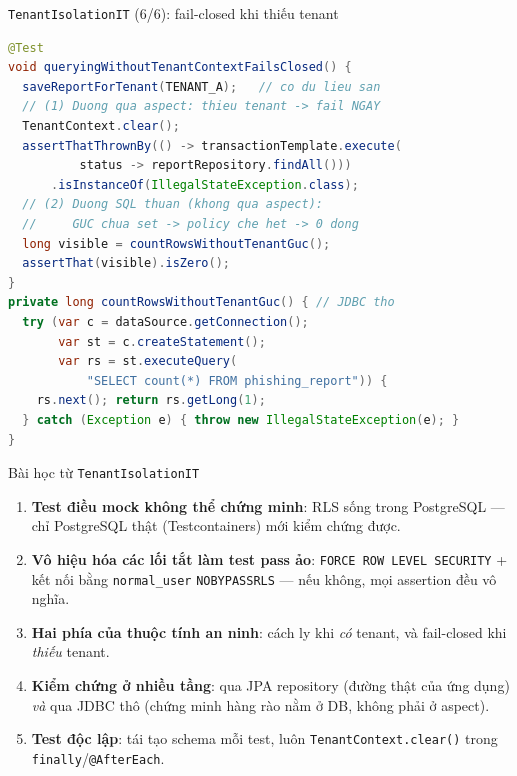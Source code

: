 \documentclass[aspectratio=169,12pt]{beamer}
\begin{document}
\begin{frame}[fragile]{\texttt{TenantIsolationIT} (6/6): fail-closed khi thiếu tenant}
  \vspace*{-0.4em}
\begin{lstlisting}[language=Java,style=codesm,basicstyle=\ttfamily\scriptsize]
@Test
void queryingWithoutTenantContextFailsClosed() {
  saveReportForTenant(TENANT_A);   // co du lieu san
  // (1) Duong qua aspect: thieu tenant -> fail NGAY
  TenantContext.clear();
  assertThatThrownBy(() -> transactionTemplate.execute(
          status -> reportRepository.findAll()))
      .isInstanceOf(IllegalStateException.class);
  // (2) Duong SQL thuan (khong qua aspect):
  //     GUC chua set -> policy che het -> 0 dong
  long visible = countRowsWithoutTenantGuc();
  assertThat(visible).isZero();
}
private long countRowsWithoutTenantGuc() { // JDBC tho
  try (var c = dataSource.getConnection();
       var st = c.createStatement();
       var rs = st.executeQuery(
           "SELECT count(*) FROM phishing_report")) {
    rs.next(); return rs.getLong(1);
  } catch (Exception e) { throw new IllegalStateException(e); }
}
\end{lstlisting}
\end{frame}

\begin{frame}{Bài học từ \texttt{TenantIsolationIT}}
  \begin{enumerate}
    \item \textbf{Test điều mock không thể chứng minh}: RLS sống trong
      PostgreSQL --- chỉ PostgreSQL thật (Testcontainers) mới kiểm chứng được.
    \item \textbf{Vô hiệu hóa các lối tắt làm test pass ảo}:
      \texttt{FORCE ROW LEVEL SECURITY} + kết nối bằng \texttt{normal\_user}
      \texttt{NOBYPASSRLS} --- nếu không, mọi assertion đều vô nghĩa.
    \item \textbf{Hai phía của thuộc tính an ninh}: cách ly khi \emph{có}
      tenant, và fail-closed khi \emph{thiếu} tenant.
    \item \textbf{Kiểm chứng ở nhiều tầng}: qua JPA repository (đường thật của
      ứng dụng) \emph{và} qua JDBC thô (chứng minh hàng rào nằm ở DB, không
      phải ở aspect).
    \item \textbf{Test độc lập}: tái tạo schema mỗi test, luôn
      \texttt{TenantContext.clear()} trong \texttt{finally}/\texttt{@AfterEach}.
  \end{enumerate}
\end{frame}
\end{document}
